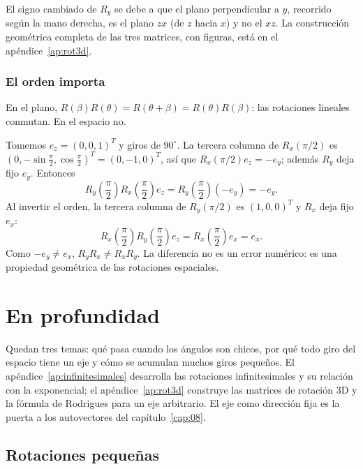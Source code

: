 El signo cambiado de \(R_y\) se debe a que el plano perpendicular a \(y\), recorrido según la
mano derecha, es el plano \(zx\) (de \(z\) hacia \(x\)) y no el \(xz\). La construcción
geométrica completa de las tres matrices, con figuras, está en el
apéndice~\ref{ap:rot3d}.

\subsubsection{El orden importa}\label{sec:orden-importa}

En el plano, \(R(\beta)R(\theta)=R(\theta+\beta)=R(\theta)R(\beta)\): las rotaciones lineales
conmutan. En el espacio no.

\begin{ejemplo}
Tomemos \(e_z=(0,0,1)^T\) y giros de \(90^\circ\). La tercera columna de
\(R_x(\pi/2)\) es \((0,-\sin\tfrac{\pi}{2},\cos\tfrac{\pi}{2})^T=(0,-1,0)^T\), así que
\(R_x(\pi/2)e_z=-e_y\); además \(R_y\) deja fijo \(e_y\). Entonces
\[
R_y\left(\frac{\pi}{2}\right)
R_x\left(\frac{\pi}{2}\right)e_z
=R_y\left(\frac{\pi}{2}\right)(-e_y)
=-e_y.
\]
Al invertir el orden, la tercera columna de \(R_y(\pi/2)\) es \((1,0,0)^T\) y \(R_x\) deja
fijo \(e_x\):
\[
R_x\left(\frac{\pi}{2}\right)
R_y\left(\frac{\pi}{2}\right)e_z
=R_x\left(\frac{\pi}{2}\right)e_x
=e_x.
\]
Como \(-e_y\neq e_x\), \(R_yR_x\neq R_xR_y\). La diferencia no es un error numérico: es una
propiedad geométrica de las rotaciones espaciales.
\end{ejemplo}

\section{En profundidad}

Quedan tres temas: qué pasa cuando los ángulos son chicos, por qué todo giro del espacio tiene
un eje y cómo se acumulan muchos giros pequeños. El apéndice~\ref{ap:infinitesimales}
desarrolla las rotaciones infinitesimales y su relación con la exponencial; el
apéndice~\ref{ap:rot3d} construye las matrices de rotación 3D y la fórmula de Rodrigues para
un eje arbitrario. El eje como dirección fija es la puerta a los autovectores del
capítulo~\ref{cap:08}.

\subsection{Rotaciones pequeñas}

